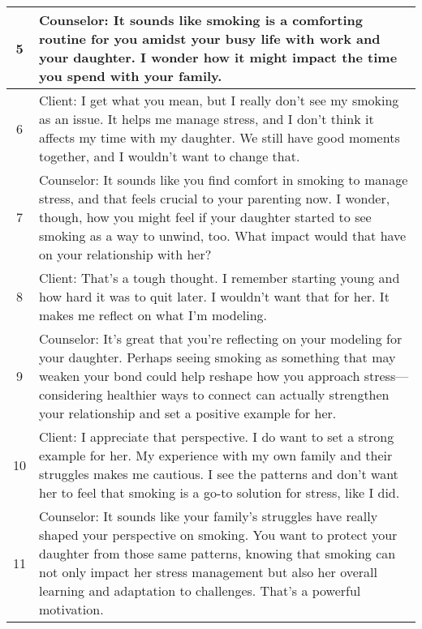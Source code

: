 \begin{table*}[ht]
\begin{tabularx}{\textwidth}{c X}
5       & Counselor: It sounds like smoking is a comforting routine for you amidst your busy life with work and your daughter. I wonder how it might impact the time you spend with your family.                                                                                                                                                             \\ \hline
6       & Client: I get what you mean, but I really don't see my smoking as an issue. It helps me manage stress, and I don’t think it affects my time with my daughter. We still have good moments together, and I wouldn't want to change that.                                                                                                             \\ \hline
7       & Counselor: It sounds like you find comfort in smoking to manage stress, and that feels crucial to your parenting now. I wonder, though, how you might feel if your daughter started to see smoking as a way to unwind, too. What impact would that have on your relationship with her?                                                             \\ \hline
8       & Client: That’s a tough thought. I remember starting young and how hard it was to quit later. I wouldn’t want that for her. It makes me reflect on what I’m modeling.                                                                                                   \\ \hline
9       & Counselor: It's great that you're reflecting on your modeling for your daughter. Perhaps seeing smoking as something that may weaken your bond could help reshape how you approach stress—considering healthier ways to connect can actually strengthen your relationship and set a positive example for her.                                      \\ \hline
10      & Client: I appreciate that perspective. I do want to set a strong example for her. My experience with my own family and their struggles makes me cautious. I see the patterns and don’t want her to feel that smoking is a go-to solution for stress, like I did.                                                                                   \\ \hline
11      & Counselor: It sounds like your family’s struggles have really shaped your perspective on smoking. You want to protect your daughter from those same patterns, knowing that smoking can not only impact her stress management but also her overall learning and adaptation to challenges. That’s a powerful motivation.                             \\ \hline

\end{tabularx}
\end{table*}
